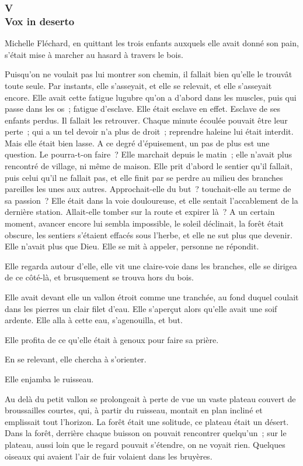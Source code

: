 \documentclass[french,twoside]{book} %
\begin{document}
 \subsubsection[{V. Vox in deserto}]{V \\
Vox in deserto}
\label{p3l4c5}
\noindent Michelle Fléchard, en quittant les trois enfants auxquels elle avait donné son pain, s’était mise à marcher au hasard à travers le bois.\par
Puisqu’on ne voulait pas lui montrer son chemin, il fallait bien qu’elle le trouvât toute seule. Par instants, elle s’asseyait, et elle se relevait, et elle s’asseyait encore. Elle avait cette fatigue lugubre qu’on a d’abord dans les muscles, puis qui passe dans les os ; fatigue d’esclave. Elle était esclave en effet. Esclave de ses enfants perdus. Il fallait les retrouver. Chaque minute écoulée pouvait être leur perte ; qui a un tel devoir n’a plus de droit ; reprendre haleine lui était interdit. Mais elle était bien lasse. A ce degré d’épuisement, un pas de plus est une question. Le pourra-t-on faire ? Elle marchait depuis le matin ; elle n’avait plus rencontré de village, ni même de maison. Elle prit d’abord le sentier qu’il fallait, puis celui qu’il ne fallait pas, et elle finit par se perdre au milieu des branches pareilles les unes aux autres. Approchait-elle du but ? touchait-elle au terme de sa passion ? Elle était dans la voie douloureuse, et elle sentait l’accablement de la dernière  station. Allait-elle tomber sur la route et expirer là ? A un certain moment, avancer encore lui sembla impossible, le soleil déclinait, la forêt était obscure, les sentiers s’étaient effacés sous l’herbe, et elle ne sut plus que devenir. Elle n’avait plus que Dieu. Elle se mit à appeler, personne ne répondit.\par
Elle regarda autour d’elle, elle vit une claire-voie dans les branches, elle se dirigea de ce côté-là, et brusquement se trouva hors du bois.\par
Elle avait devant elle un vallon étroit comme une tranchée, au fond duquel coulait dans les pierres un clair filet d’eau. Elle s’aperçut alors qu’elle avait une soif ardente. Elle alla à cette eau, s’agenouilla, et but.\par
Elle profita de ce qu’elle était à genoux pour faire sa prière.\par
En se relevant, elle chercha à s’orienter.\par
Elle enjamba le ruisseau.\par
Au delà du petit vallon se prolongeait à perte de vue un vaste plateau couvert de broussailles courtes, qui, à partir du ruisseau, montait en plan incliné et emplissait tout l’horizon. La forêt était une solitude, ce plateau était un désert. Dans la forêt, derrière chaque buisson on pouvait rencontrer quelqu’un ; sur le plateau, aussi loin que le regard pouvait s’étendre, on ne voyait rien. Quelques oiseaux qui avaient l’air de fuir volaient dans les bruyères.\par
\end{document}
